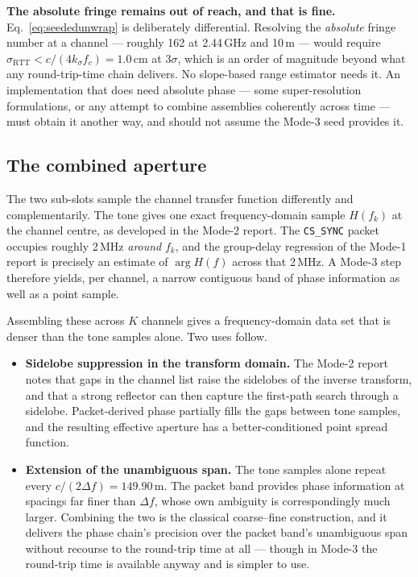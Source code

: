 \documentclass[11pt,a4paper]{article}
\newcommand{\RTT}{\mathrm{RTT}}
\newcommand{\code}[1]{\texttt{\small #1}}
\begin{document}
\begin{caution}
\textbf{The absolute fringe remains out of reach, and that is fine.} Eq.~\eqref{eq:seededunwrap} is
deliberately differential. Resolving the \emph{absolute} fringe number at a channel --- roughly 162
at 2.44\,GHz and 10\,m --- would require $\sigma_{\RTT} < c/(4 k_\sigma f_c) = 1.0$\,cm at $3\sigma$,
which is an order of magnitude beyond what any round-trip-time chain delivers. No slope-based range
estimator needs it. An implementation that does need absolute phase --- some super-resolution
formulations, or any attempt to combine assemblies coherently across time --- must obtain it another
way, and should not assume the Mode-3 seed provides it.
\end{caution}

\subsection{The combined aperture}

The two sub-slots sample the channel transfer function differently and complementarily. The tone
gives one exact frequency-domain sample $H(f_k)$ at the channel centre, as developed in the Mode-2
report. The \code{CS\_SYNC} packet occupies roughly 2\,MHz \emph{around} $f_k$, and the group-delay
regression of the Mode-1 report is precisely an estimate of $\arg H(f)$ across that 2\,MHz. A Mode-3
step therefore yields, per channel, a narrow contiguous band of phase information as well as a point
sample.

Assembling these across $K$ channels gives a frequency-domain data set that is denser than the tone
samples alone. Two uses follow.

\begin{itemize}[leftmargin=1.4em,itemsep=1pt]
  \item \textbf{Sidelobe suppression in the transform domain.} The Mode-2 report notes that gaps in
    the channel list raise the sidelobes of the inverse transform, and that a strong reflector can
    then capture the first-path search through a sidelobe. Packet-derived phase partially fills the
    gaps between tone samples, and the resulting effective aperture has a better-conditioned point
    spread function.
  \item \textbf{Extension of the unambiguous span.} The tone samples alone repeat every
    $c/(2\Delta f)=149.90$\,m. The packet band provides phase information at spacings far finer than
    $\Delta f$, whose own ambiguity is correspondingly much larger. Combining the two is the
    classical coarse--fine construction, and it delivers the phase chain's precision over the packet
    band's unambiguous span without recourse to the round-trip time at all --- though in Mode-3 the
    round-trip time is available anyway and is simpler to use.
\end{itemize}
\end{document}
